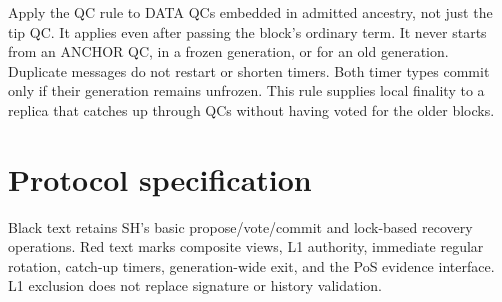 \documentclass[11pt,a4paper]{article}
\newcounter{protocol}
\begin{document}
Apply the QC rule to DATA QCs embedded in admitted ancestry, not just the
tip QC. It applies even after passing the block's ordinary term. It
never starts from an ANCHOR QC, in a frozen generation, or for an old
generation. Duplicate messages do not restart or shorten timers.
Both timer types commit only if their generation remains unfrozen.
This rule supplies local finality to a replica that catches up through
QCs without having voted for the older blocks.

\section{Protocol specification}
\label{sec:protocol}
Black text retains SH's basic propose/vote/commit and lock-based recovery
operations. Red text marks composite views, L1 authority, immediate regular
rotation, catch-up timers, generation-wide exit, and the PoS evidence
interface. L1 exclusion does not replace signature or history validation.
\end{document}

